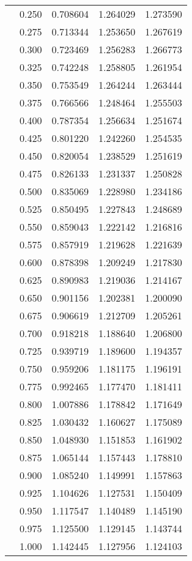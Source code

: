 \begin{tabular}{llrrr}
         & 0.250 &   0.708604 &   1.264029 &   1.273590 \\
         & 0.275 &   0.713344 &   1.253650 &   1.267619 \\
         & 0.300 &   0.723469 &   1.256283 &   1.266773 \\
         & 0.325 &   0.742248 &   1.258805 &   1.261954 \\
         & 0.350 &   0.753549 &   1.264244 &   1.263444 \\
         & 0.375 &   0.766566 &   1.248464 &   1.255503 \\
         & 0.400 &   0.787354 &   1.256634 &   1.251674 \\
         & 0.425 &   0.801220 &   1.242260 &   1.254535 \\
         & 0.450 &   0.820054 &   1.238529 &   1.251619 \\
         & 0.475 &   0.826133 &   1.231337 &   1.250828 \\
         & 0.500 &   0.835069 &   1.228980 &   1.234186 \\
         & 0.525 &   0.850495 &   1.227843 &   1.248689 \\
         & 0.550 &   0.859043 &   1.222142 &   1.216816 \\
         & 0.575 &   0.857919 &   1.219628 &   1.221639 \\
         & 0.600 &   0.878398 &   1.209249 &   1.217830 \\
         & 0.625 &   0.890983 &   1.219036 &   1.214167 \\
         & 0.650 &   0.901156 &   1.202381 &   1.200090 \\
         & 0.675 &   0.906619 &   1.212709 &   1.205261 \\
         & 0.700 &   0.918218 &   1.188640 &   1.206800 \\
         & 0.725 &   0.939719 &   1.189600 &   1.194357 \\
         & 0.750 &   0.959206 &   1.181175 &   1.196191 \\
         & 0.775 &   0.992465 &   1.177470 &   1.181411 \\
         & 0.800 &   1.007886 &   1.178842 &   1.171649 \\
         & 0.825 &   1.030432 &   1.160627 &   1.175089 \\
         & 0.850 &   1.048930 &   1.151853 &   1.161902 \\
         & 0.875 &   1.065144 &   1.157443 &   1.178810 \\
         & 0.900 &   1.085240 &   1.149991 &   1.157863 \\
         & 0.925 &   1.104626 &   1.127531 &   1.150409 \\
         & 0.950 &   1.117547 &   1.140489 &   1.145190 \\
         & 0.975 &   1.125500 &   1.129145 &   1.143744 \\
         & 1.000 &   1.142445 &   1.127956 &   1.124103 \\
\bottomrule
\end{tabular}
